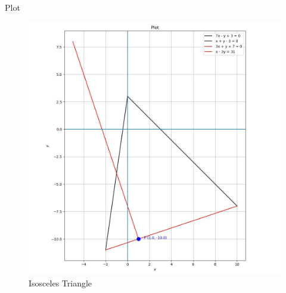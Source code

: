 \documentclass{beamer}
\begin{document}
\begin{frame}{Plot}
    \begin{figure}
        \centering
        \includegraphics[width=0.5\columnwidth]{../figs/plot_c.jpg}
        \caption{Isosceles Triangle}
        \label{fig:fig}
    \end{figure}
\end{frame}
\end{document}
